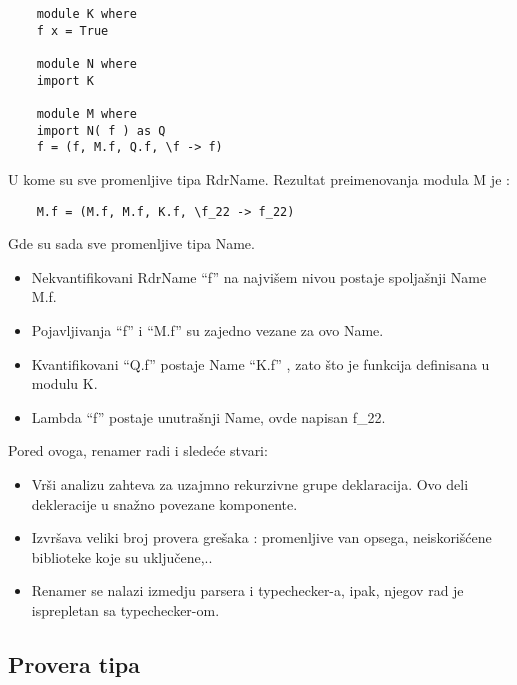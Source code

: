 \begin{verbatim}
	module K where
	f x = True
	
	module N where
	import K
	
	module M where
	import N( f ) as Q
	f = (f, M.f, Q.f, \f -> f)
\end{verbatim}
U kome su sve promenljive tipa RdrName. Rezultat preimenovanja modula M je :
\begin{verbatim}
	M.f = (M.f, M.f, K.f, \f_22 -> f_22)
\end{verbatim} 
Gde su sada sve promenljive tipa Name.
\begin{itemize}
	\item Nekvantifikovani RdrName “f” na najvišem nivou postaje spoljašnji Name M.f.
	\item Pojavljivanja “f” i  “M.f” su zajedno vezane za ovo Name.
	\item  Kvantifikovani “Q.f” postaje Name “K.f” , zato što je funkcija definisana u modulu K.
	\item Lambda “f” postaje unutrašnji Name, ovde napisan f\_22.
\end{itemize}

Pored ovoga, renamer radi i sledeće stvari:
\begin{itemize}
	\item Vrši analizu zahteva za uzajmno rekurzivne grupe deklaracija. Ovo deli dekleracije u snažno povezane komponente.
	\item Izvršava veliki broj provera grešaka : promenljive van opsega, neiskorišćene biblioteke koje su uključene,..
	\item Renamer se nalazi izmedju parsera i typechecker-a, ipak, njegov rad je isprepletan sa typechecker-om.
\end{itemize}

\subsection{Provera tipa}
\label{subsec:podnaslovTypecheck}

